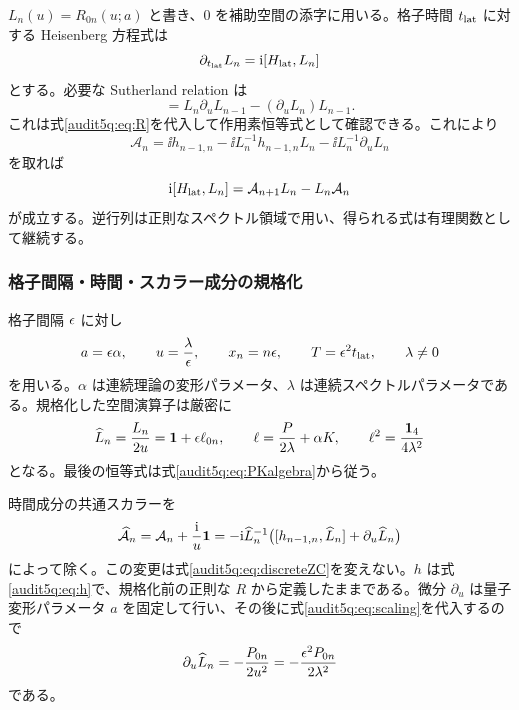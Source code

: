 $L_n(u)=R_{0n}(u;a)$ と書き、$0$ を補助空間の添字に用いる。格子時間 $t_{\rm lat}$ に対する Heisenberg 方程式は
\begin{equation}
\partial_{t_{\rm lat}}L_n=\mathrm i[H_{\rm lat},L_n]
\label{audit5q:eq:Heisenberg}
\end{equation}
とする。必要な Sutherland relation は
\begin{equation}
[h_{n-1,n},L_nL_{n-1}]
=L_n\partial_uL_{n-1}-(\partial_uL_n)L_{n-1}.
\label{audit5q:eq:Sutherland}
\end{equation}
これは式\eqref{audit5q:eq:R}を代入して作用素恒等式として確認できる。これにより
\begin{equation}
\mathcal A_n=\ii h_{n-1,n}
-\ii L_n^{-1}h_{n-1,n}L_n
-\ii L_n^{-1}\partial_uL_n
\label{audit5q:eq:rawA}
\end{equation}
を取れば
\begin{equation}
\mathrm i[H_{\rm lat},L_n]=\mathcal A_{n+1}L_n-L_n\mathcal A_n
\label{audit5q:eq:discreteZC}
\end{equation}
が成立する。逆行列は正則なスペクトル領域で用い、得られる式は有理関数として継続する。

\subsubsection{格子間隔・時間・スカラー成分の規格化}

格子間隔 $\epsilon$ に対し
\begin{equation}
a=\epsilon\alpha,\qquad u=\frac{\lambda}{\epsilon},\qquad
x_n=n\epsilon,\qquad T=\epsilon^2t_{\rm lat},\qquad\lambda\ne0
\label{audit5q:eq:scaling}
\end{equation}
を用いる。$\alpha$ は連続理論の変形パラメータ、$\lambda$ は連続スペクトルパラメータである。規格化した空間演算子は厳密に
\begin{equation}
\widehat L_n=\frac{L_n}{2u}=\mathbf 1+\epsilon\ell_{0n},\qquad
\ell=\frac{P}{2\lambda}+\alpha K,\qquad
\ell^2=\frac{\mathbf 1_4}{4\lambda^2}
\label{audit5q:eq:Lhat}
\end{equation}
となる。最後の恒等式は式\eqref{audit5q:eq:PKalgebra}から従う。

時間成分の共通スカラーを
\begin{equation}
\widehat{\mathcal A}_n=\mathcal A_n+\frac{\mathrm i}{u}\mathbf 1
=-\mathrm i\widehat L_n^{-1}\bigl([h_{n-1,n},\widehat L_n]
+\partial_u\widehat L_n\bigr)
\label{audit5q:eq:Ahat}
\end{equation}
によって除く。この変更は式\eqref{audit5q:eq:discreteZC}を変えない。$h$ は式\eqref{audit5q:eq:h}で、規格化前の正則な $R$ から定義したままである。微分 $\partial_u$ は量子変形パラメータ $a$ を固定して行い、その後に式\eqref{audit5q:eq:scaling}を代入するので
\begin{equation}
\partial_u\widehat L_n=-\frac{P_{0n}}{2u^2}
=-\frac{\epsilon^2P_{0n}}{2\lambda^2}
\label{audit5q:eq:udiff}
\end{equation}
である。

